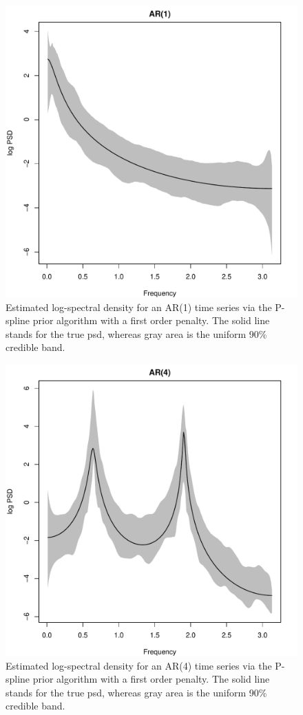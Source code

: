 \documentclass[twocolumn,final]{svjour3}
\begin{document}
\begin{figure}[]
	\centering
	\includegraphics[scale=0.4,clip=true,angle=0]{ar1.pdf}
	\caption{Estimated log-spectral density for an AR(1) time series via the P-spline prior algorithm with a first order penalty.  The solid line stands for the true psd, whereas gray area is the uniform 90\% credible band.}
	\label{fig:ar1}
\end{figure}

\begin{figure}[]
	\centering
	\includegraphics[scale=0.4,clip=true,angle=0]{ar4.pdf}
	\caption{Estimated log-spectral density for an AR(4) time series via the P-spline prior algorithm with a first order penalty.  The solid line stands for the true psd, whereas gray area is the uniform 90\% credible band.}
	\label{fig:ar4}
\end{figure}
\end{document}
